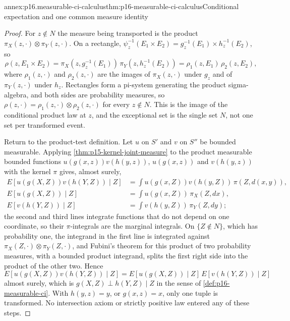 \begin{annexitem}{annex:p16.measurable-ci-calculus}{thm:p16-measurable-ci-calculus}{Conditional expectation and one common measure identity}
\begin{proof}
For \(z\notin N\) the measure being transported is the product
\(\pi_X(z,\cdot)\otimes\pi_Y(z,\cdot)\). On a rectangle,
\(\psi_z^{-1}(E_1\times E_2)=g_z^{-1}(E_1)\times h_z^{-1}(E_2)\), so
\[
 \rho(z,E_1\times E_2)
 =\pi_X(z,g_z^{-1}(E_1))\,\pi_Y(z,h_z^{-1}(E_2))
 =\rho_1(z,E_1)\,\rho_2(z,E_2),
\]
where \(\rho_1(z,\cdot)\) and \(\rho_2(z,\cdot)\) are the images of
\(\pi_X(z,\cdot)\) under \(g_z\) and of \(\pi_Y(z,\cdot)\) under \(h_z\).
Rectangles form a pi-system generating the product sigma-algebra, and
both sides are probability measures, so
\(\rho(z,\cdot)=\rho_1(z,\cdot)\otimes\rho_2(z,\cdot)\) for every
\(z\notin N\). This is the image of the conditional product law at
\(z\), and the exceptional set is the single set \(N\), not one set per
transformed event.

Return to the product-test definition. Let \(u\) on \(S'\) and \(v\)
on \(S''\) be bounded measurable. Applying
\cref{thm:p15-kernel-joint-measure} to the product measurable bounded
functions \(u(g(x,z))v(h(y,z))\), \(u(g(x,z))\) and \(v(h(y,z))\) with
the kernel \(\pi\) gives, almost surely,
\[
\begin{aligned}
 E[u(g(X,Z))v(h(Y,Z))\mid Z]&=\int u(g(x,Z))v(h(y,Z))\,\pi(Z,d(x,y)),\\
 E[u(g(X,Z))\mid Z]&=\int u(g(x,Z))\,\pi_X(Z,dx),\\
 E[v(h(Y,Z))\mid Z]&=\int v(h(y,Z))\,\pi_Y(Z,dy);
\end{aligned}
\]
the second and third lines integrate functions that do not depend on
one coordinate, so their \(\pi\)-integrals are the marginal integrals.
On \(\{Z\notin N\}\), which has probability one, the integrand in the
first line is integrated against
\(\pi_X(Z,\cdot)\otimes\pi_Y(Z,\cdot)\), and Fubini's theorem for this
product of two probability measures, with a bounded product integrand,
splits the first right side into the product of the other two. Hence
\[
 E[u(g(X,Z))v(h(Y,Z))\mid Z]=E[u(g(X,Z))\mid Z]\,E[v(h(Y,Z))\mid Z]
\]
almost surely, which is \(g(X,Z)\perp h(Y,Z)\mid Z\) in the sense of
\cref{def:p16-measurable-ci}. With \(h(y,z)=y\), or \(g(x,z)=x\), only
one tuple is transformed. No intersection axiom or strictly positive
law entered any of these steps.
\end{proof}
\end{annexitem}

